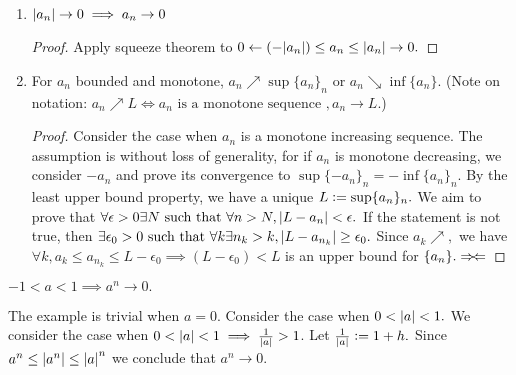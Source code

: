 \begin{enumerate}
\begin{proof}
        Allowing $\epsilon_a=\epsilon\sqrt[k]{a^{k-1}}$ completes the proof.
    \end{proof}
    
    \item $\abs{a_n}\rightarrow 0\implies a_n\rightarrow 0$
    \begin{proof}
        Apply squeeze theorem to $0\leftarrow(-\abs{a_n})\leq a_n \leq \abs{a_n}\rightarrow 0.$
    \end{proof}
    
    \item
    \begin{theorem}
    For $a_n$ bounded and monotone, $a_n\nearrow\sup\{a_n\}_n$ or $a_n\searrow\inf\{a_n\}$. (Note on notation: $a_n\nearrow L \iff a_n \text{ is a monotone sequence }, a_n\rightarrow L.$)
    \end{theorem}
    \begin{proof}
        Consider the case when $a_n$ is a monotone increasing sequence. The assumption is without loss of generality, for if $a_n$ is monotone decreasing, we consider $-a_n$ and prove its convergence to $\sup\{-a_n\}_n=-\inf\{a_n\}_n.$ By the least upper bound property, we have a unique $L\mathrel{\mathop:}=\sup\{a_n\}_n.$ We aim to prove that $\forall\epsilon>0\exists N\text{ such that }\forall n>N,\abs{L-a_n}<\epsilon.$ If the statement is not true, then $\exists\epsilon_0>0\text{ such that }\forall k\exists n_k>k,\abs{L-a_{n_k}}\geq\epsilon_0.$ Since $a_k\nearrow,$ we have $\forall k, a_k\leq a_{n_k}\leq L-\epsilon_0\implies (L-\epsilon_0)<L$ is an upper bound for $\{a_n\}.\Rightarrow\!\Leftarrow$
    \end{proof}
    
\end{enumerate}

\begin{example}
    $-1<a<1\implies a^n\rightarrow0.$
    
    The example is trivial when $a=0$. Consider the case when $0<\abs{a}<1.$ We consider the case when $0<\abs{a}<1\implies\frac{1}{\abs{a}}> 1$. Let $\frac{1}{\abs{a}}\mathrel{\mathop:}= 1+h.$
    Since $a^n \leq \abs{a^n} \leq \abs{a}^n$ we conclude that $a^n\rightarrow 0.$
\end{example}

